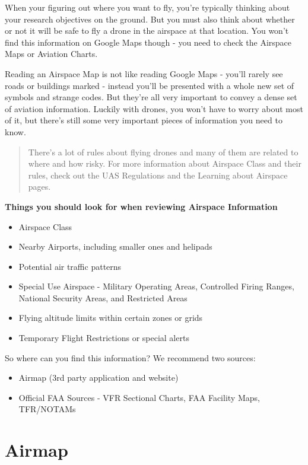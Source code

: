 \documentclass[
]{book}
\providecommand{\tightlist}{%
  \setlength{\itemsep}{0pt}\setlength{\parskip}{0pt}}
\begin{document}
When your figuring out where you want to fly, you're typically thinking about your research objectives on the ground. But you must also think about whether or not it will be safe to fly a drone in the airspace at that location. You won't find this information on Google Maps though - you need to check the Airspace Maps or Aviation Charts.

Reading an Airspace Map is not like reading Google Maps - you'll rarely see roads or buildings marked - instead you'll be presented with a whole new set of symbols and strange codes. But they're all very important to convey a dense set of aviation information. Luckily with drones, you won't have to worry about most of it, but there's still some very important pieces of information you need to know.

\begin{quote}
There's a lot of rules about flying drones and many of them are related to where and how risky. For more information about Airspace Class and their rules, check out the UAS Regulations and the Learning about Airspace pages.
\end{quote}

\textbf{Things you should look for when reviewing Airspace Information}

\begin{itemize}
\tightlist
\item
  Airspace Class
\item
  Nearby Airports, including smaller ones and helipads
\item
  Potential air traffic patterns
\item
  Special Use Airspace - Military Operating Areas, Controlled Firing Ranges, National Security Areas, and Restricted Areas
\item
  Flying altitude limits within certain zones or grids
\item
  Temporary Flight Restrictions or special alerts
\end{itemize}

So where can you find this information? We recommend two sources:

\begin{itemize}
\tightlist
\item
  Airmap (3rd party application and website)
\item
  Official FAA Sources - VFR Sectional Charts, FAA Facility Maps, TFR/NOTAMs
\end{itemize}

\hypertarget{airmap}{%
\section{Airmap}\label{airmap}}
\end{document}
